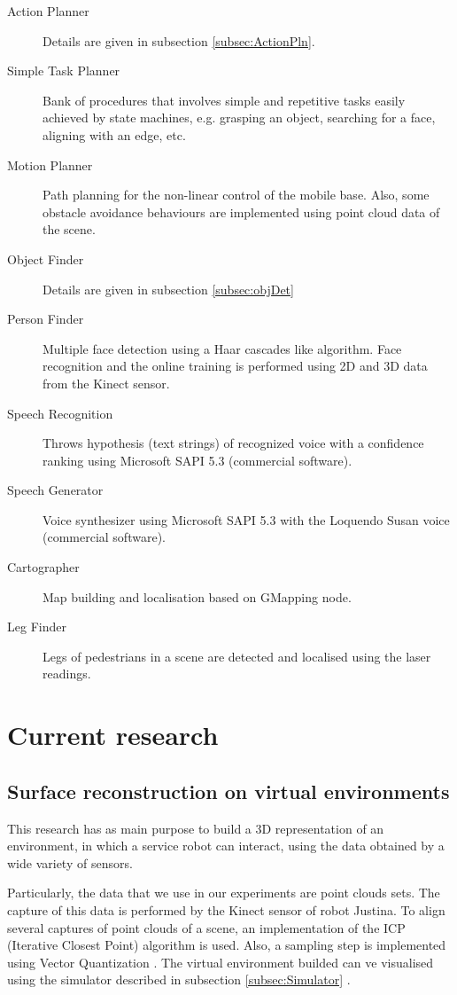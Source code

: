 \documentclass{llncs}
\begin{document}
\begin{description}
	\item[Action Planner] Details are given in subsection \ref{subsec:ActionPln}. 
	\item[Simple Task Planner] Bank of procedures that involves simple and repetitive tasks easily achieved by state machines, e.g. grasping an object, searching for a face, aligning with an edge, etc.
	\item[Motion Planner] Path planning for the non-linear control of the mobile base. Also, some obstacle avoidance behaviours are implemented using point cloud data of the scene. 
	\item[Object Finder] Details are given in subsection \ref{subsec:objDet}
	\item[Person Finder] Multiple face detection using a Haar cascades like algorithm. Face recognition and the online training is performed using 2D and 3D data from the Kinect sensor. 
	\item[Speech Recognition] Throws hypothesis (text strings) of recognized voice with a confidence ranking using Microsoft SAPI 5.3 \cite{SAPI} (commercial software).
	\item[Speech Generator] Voice synthesizer using Microsoft SAPI 5.3 \cite{SAPI} with the Loquendo Susan voice (commercial software).
	\item[Cartographer] Map building and localisation based on GMapping node.
	\item[Leg Finder] Legs of pedestrians in a scene are detected and localised using the laser readings.  
\end{description}


\section{Current research}\label{sec:CurrentResearch}

\subsection{Surface reconstruction on virtual environments}\label{subsec:SurfRecon}
This research has as main purpose to build a 3D representation of an environment, in which a service robot can interact, using the data obtained by a wide variety of sensors.

Particularly, the data that we use in our experiments are point clouds sets. The capture of this data is performed by the Kinect sensor of robot Justina. To align several captures of point clouds of a scene, an implementation of the ICP (Iterative Closest Point) algorithm is used. Also, a sampling step is implemented using Vector Quantization \cite{linde1980algorithm}. The virtual environment builded can ve visualised using the simulator described in subsection \ref{subsec:Simulator} . 
\end{document}
